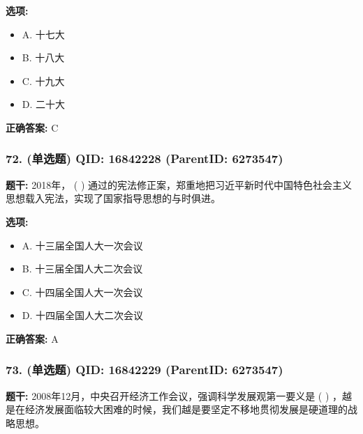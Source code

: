 \documentclass[12pt,UTF8]{ctexart}
\begin{document}
\textbf{选项:}
\begin{itemize}[leftmargin=*]

  \item A. 十七大

  \item B. 十八大

  \item C. 十九大

  \item D. 二十大

\end{itemize}

\textbf{正确答案:}
C

\vspace{0.3em}\hrulefill\vspace{0.7em}

\subsubsection*{72. (单选题) \small QID: 16842228 (ParentID: 6273547)}

\textbf{题干:}
2018年， ( ) 通过的宪法修正案，郑重地把习近平新时代中国特色社会主义思想载入宪法，实现了国家指导思想的与时俱进。



\textbf{选项:}
\begin{itemize}[leftmargin=*]

  \item A. 十三届全国人大一次会议

  \item B. 十三届全国人大二次会议

  \item C. 十四届全国人大一次会议

  \item D. 十四届全国人大二次会议

\end{itemize}

\textbf{正确答案:}
A

\vspace{0.3em}\hrulefill\vspace{0.7em}

\subsubsection*{73. (单选题) \small QID: 16842229 (ParentID: 6273547)}

\textbf{题干:}
2008年12月，中央召开经济工作会议，强调科学发展观第一要义是 ( ) ，越是在经济发展面临较大困难的时候，我们越是要坚定不移地贯彻发展是硬道理的战略思想。
\end{document}
